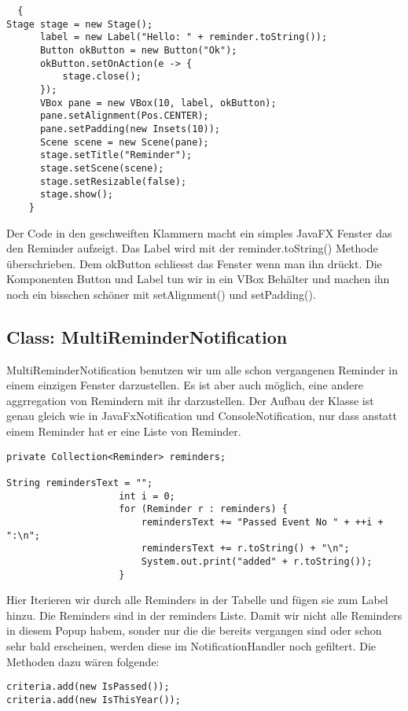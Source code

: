 \begin{lstlisting}
  {
Stage stage = new Stage();
	  label = new Label("Hello: " + reminder.toString());
	  Button okButton = new Button("Ok");
	  okButton.setOnAction(e -> {
	      stage.close();
	  });
	  VBox pane = new VBox(10, label, okButton);
	  pane.setAlignment(Pos.CENTER);
	  pane.setPadding(new Insets(10));
	  Scene scene = new Scene(pane);
	  stage.setTitle("Reminder");
	  stage.setScene(scene);
	  stage.setResizable(false);
	  stage.show();
    }
\end{lstlisting}
Der Code in den geschweiften Klammern macht ein simples JavaFX Fenster das den Reminder aufzeigt. Das Label wird mit der reminder.toString() Methode überschrieben. Dem okButton schliesst das Fenster wenn man ihn drückt. Die Komponenten Button und Label tun wir in ein VBox Behälter und machen ihn noch ein bisschen schöner mit setAlignment() und setPadding().


\subsection{Class: MultiReminderNotification}
MultiReminderNotification benutzen wir um alle schon vergangenen Reminder in einem einzigen Fenster darzustellen. Es ist aber auch möglich, eine andere aggrregation von  Remindern mit ihr darzustellen. Der Aufbau der Klasse ist genau gleich wie in JavaFxNotification und ConsoleNotification, nur dass anstatt einem Reminder hat er eine Liste von Reminder.
\begin{lstlisting}
private Collection<Reminder> reminders;

String remindersText = "";
                    int i = 0;
                    for (Reminder r : reminders) {
                        remindersText += "Passed Event No " + ++i + ":\n";
                        remindersText += r.toString() + "\n";
                        System.out.print("added" + r.toString());
                    }
\end{lstlisting}
Hier Iterieren wir durch alle Reminders in der Tabelle und fügen sie zum Label hinzu. Die Reminders sind in der reminders Liste. Damit wir nicht alle Reminders in diesem Popup habem, sonder nur die die bereits vergangen sind oder schon sehr bald erscheinen, werden diese im NotificationHandler noch gefiltert.
Die Methoden dazu wären folgende:
\begin{lstlisting}
criteria.add(new IsPassed());
criteria.add(new IsThisYear());
\end{lstlisting}

